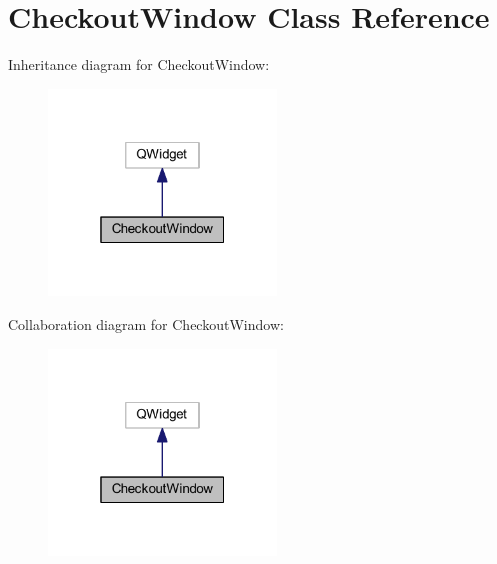 \hypertarget{class_checkout_window}{}\section{Checkout\+Window Class Reference}
\label{class_checkout_window}


Inheritance diagram for Checkout\+Window\+:
\nopagebreak
\begin{figure}[H]
\begin{center}
\leavevmode
\includegraphics[width=172pt]{class_checkout_window__inherit__graph}
\end{center}
\end{figure}


Collaboration diagram for Checkout\+Window\+:
\nopagebreak
\begin{figure}[H]
\begin{center}
\leavevmode
\includegraphics[width=172pt]{class_checkout_window__coll__graph}
\end{center}
\end{figure}
